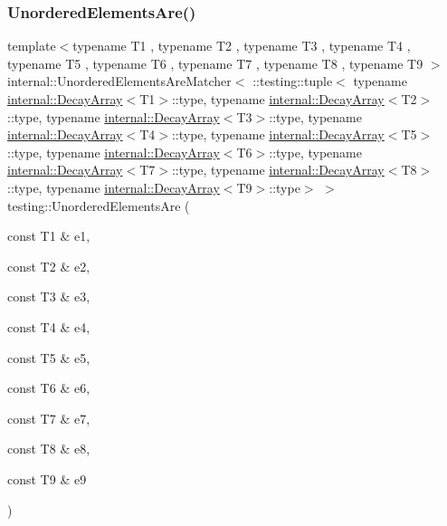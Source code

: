 \subsubsection{\texorpdfstring{UnorderedElementsAre()}{UnorderedElementsAre()}\hspace{0.1cm}{\footnotesize\ttfamily [10/11]}}
{\footnotesize\ttfamily template$<$typename T1 , typename T2 , typename T3 , typename T4 , typename T5 , typename T6 , typename T7 , typename T8 , typename T9 $>$ \\
internal\+::\+Unordered\+Elements\+Are\+Matcher$<$ \+::testing\+::tuple$<$ typename \mbox{\hyperlink{structtesting_1_1internal_1_1DecayArray}{internal\+::\+Decay\+Array}}$<$T1$>$\+::type, typename \mbox{\hyperlink{structtesting_1_1internal_1_1DecayArray}{internal\+::\+Decay\+Array}}$<$T2$>$\+::type, typename \mbox{\hyperlink{structtesting_1_1internal_1_1DecayArray}{internal\+::\+Decay\+Array}}$<$T3$>$\+::type, typename \mbox{\hyperlink{structtesting_1_1internal_1_1DecayArray}{internal\+::\+Decay\+Array}}$<$T4$>$\+::type, typename \mbox{\hyperlink{structtesting_1_1internal_1_1DecayArray}{internal\+::\+Decay\+Array}}$<$T5$>$\+::type, typename \mbox{\hyperlink{structtesting_1_1internal_1_1DecayArray}{internal\+::\+Decay\+Array}}$<$T6$>$\+::type, typename \mbox{\hyperlink{structtesting_1_1internal_1_1DecayArray}{internal\+::\+Decay\+Array}}$<$T7$>$\+::type, typename \mbox{\hyperlink{structtesting_1_1internal_1_1DecayArray}{internal\+::\+Decay\+Array}}$<$T8$>$\+::type, typename \mbox{\hyperlink{structtesting_1_1internal_1_1DecayArray}{internal\+::\+Decay\+Array}}$<$T9$>$\+::type$>$ $>$ testing\+::\+Unordered\+Elements\+Are (\begin{DoxyParamCaption}\item[{const T1 \&}]{e1,  }\item[{const T2 \&}]{e2,  }\item[{const T3 \&}]{e3,  }\item[{const T4 \&}]{e4,  }\item[{const T5 \&}]{e5,  }\item[{const T6 \&}]{e6,  }\item[{const T7 \&}]{e7,  }\item[{const T8 \&}]{e8,  }\item[{const T9 \&}]{e9 }\end{DoxyParamCaption})\hspace{0.3cm}{\ttfamily [inline]}}

\mbox{\label{namespacetesting_ae0e6c9754b17623a64358da8d38c4d13}} 
